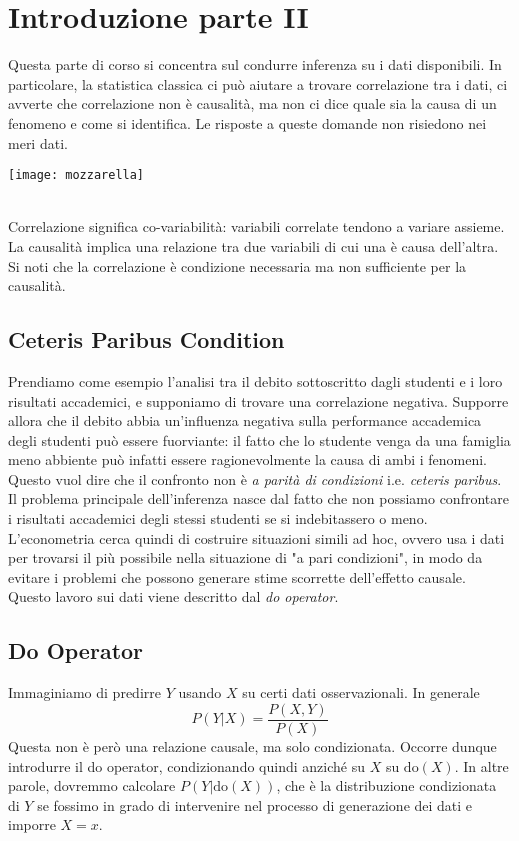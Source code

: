 \chapter{Introduzione parte II}
Questa parte di corso si concentra sul condurre inferenza su i dati disponibili.
In particolare, la statistica classica ci può aiutare a trovare correlazione tra i dati,
ci avverte che correlazione non è causalità, ma non ci dice quale 
sia la causa di un fenomeno e come si identifica.
Le risposte a queste domande non risiedono nei meri dati.
\begin{figure*}
    \texttt{[image: mozzarella]}
\end{figure*}
\\ Correlazione significa co-variabilità: variabili correlate tendono a variare assieme.
La causalità implica una relazione tra due variabili di cui una è causa dell'altra.
Si noti che la correlazione è condizione necessaria ma non sufficiente per la causalità.

\section{Ceteris Paribus Condition}
Prendiamo come esempio l'analisi tra il debito sottoscritto dagli studenti e i loro risultati
accademici, e supponiamo di trovare una correlazione negativa.
Supporre allora che il debito abbia un'influenza negativa sulla performance accademica degli
studenti può essere fuorviante: il fatto che lo studente venga da una famiglia meno abbiente
può infatti essere ragionevolmente la causa di ambi i fenomeni. 
Questo vuol dire che il confronto non è \textit{a parità di condizioni} i.e. \textit{ceteris paribus}.
Il problema principale dell'inferenza nasce dal fatto che non possiamo confrontare i risultati
accademici degli stessi studenti se si indebitassero o meno.
L'econometria cerca quindi di costruire situazioni simili ad hoc, ovvero usa i dati per trovarsi
il più possibile nella situazione di "a pari condizioni", in modo da evitare i problemi che 
possono generare stime scorrette dell'effetto causale. Questo lavoro sui dati viene descritto 
dal \textit{do operator}.

\section{Do Operator}
Immaginiamo di predirre $Y$ usando $X$ su certi dati osservazionali. In generale
\begin{equation}
   P(Y | X) = \frac{P(X,Y)}{P(X)}
\end{equation}
Questa non è però una relazione causale, ma solo condizionata. Occorre dunque introdurre
il do operator, condizionando quindi anziché su $X$ su $\mathrm{do}(X)$.
In altre parole, dovremmo calcolare $P(Y | \mathrm{do}(X))$, che è la distribuzione condizionata
di $Y$ se fossimo in grado di intervenire nel processo di generazione dei dati e imporre 
$X = x$.
